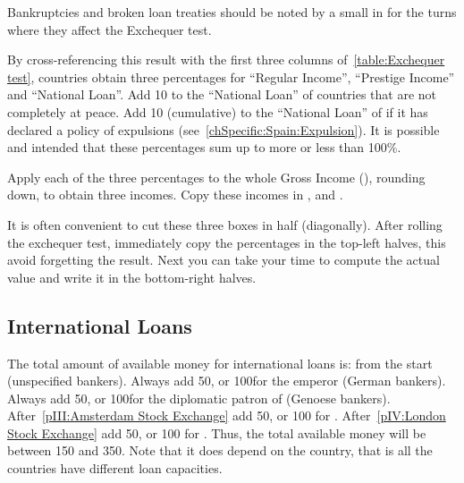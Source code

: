 \begin{playtip}
  Bankruptcies and broken loan treaties should be noted by a small \textetoile
  in  for the turns where they affect the
  Exchequer test.
\end{playtip}

\aparag[Percentages] By cross-referencing this result with the first three
columns of~\ref{table:Exchequer test}, countries obtain three percentages for
``Regular Income'', ``Prestige Income'' and ``National Loan''.
\bparag Add 10 to the ``National Loan'' of countries that are not completely
at peace.
\bparag Add 10 (cumulative) to the ``National Loan'' of \HIS if it has
declared a policy of expulsions (see~\ref{chSpecific:Spain:Expulsion}).
\bparag It is possible and intended that these percentages sum up to more or
less than 100\%.

\aparag[Incomes] Apply each of the three percentages to the whole Gross Income
(), rounding down, to obtain three incomes.
\bparag Copy these incomes in ,
 and .

\begin{playtip}
  It is often convenient to cut these three boxes in half (diagonally). After
  rolling the exchequer test, immediately copy the percentages in the top-left
  halves, this avoid forgetting the result. Next you can take your time to
  compute the actual value and write it in the bottom-right halves.
\end{playtip}


\subsection{International Loans}\label{chBudget:International loans}
 The total amount of available money for international
loans is:
\ducats from the start (unspecified bankers).
\bparag Always add 50\ducats, or 100\ducats for the emperor (German bankers).
\bparag Always add 50\ducats, or 100\ducats for the diplomatic patron of
\paysGenes (Genoese bankers).
\bparag After~\ref{pIII:Amsterdam Stock Exchange} add 50\ducats, or 100\ducats
for \HOL.
\bparag After~\ref{pIV:London Stock Exchange} add 50\ducats, or 100\ducats
for \ANG.
\bparag Thus, the total available money will be between 150 and
350\ducats. Note that it does depend on the country, that is all the countries
have different loan capacities.

